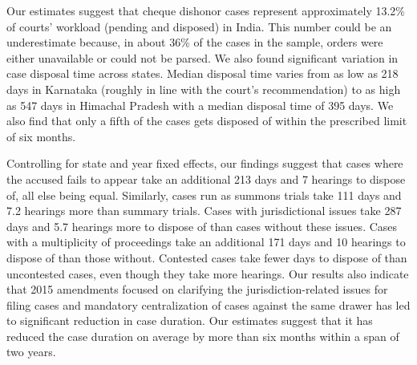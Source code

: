 \documentclass[12pt,a4paper]{article}
\begin{document}


Our estimates suggest that cheque dishonor cases represent approximately 13.2\% of courts' workload (pending and disposed) in India. This number could be an underestimate because, in about 36\% of the cases in the sample, orders were either unavailable or could not be parsed. 
We also found significant variation in case disposal time across states. Median disposal time varies from as low as 218 days in Karnataka (roughly in line with the court's recommendation) to as high as 547 days in Himachal Pradesh with a median disposal time of 395 days. We also find that only a fifth of the cases gets disposed of within the prescribed limit of six months.

Controlling for state and year fixed effects, our findings suggest that cases where the accused fails to appear take an additional 213 days and 7 hearings to dispose of, all else being equal. Similarly, cases run as summons trials take 111 days and 7.2 hearings more than summary trials. Cases with jurisdictional issues take 287 days and 5.7 hearings more to dispose of than cases without these issues. Cases with a multiplicity of proceedings take an additional 171 days and 10 hearings to dispose of than those without. Contested cases take fewer days to dispose of than uncontested cases, even though they take more hearings. Our results also indicate that 2015 amendments focused on clarifying the jurisdiction-related issues for filing cases and mandatory centralization of cases against the same drawer has led to significant reduction in case duration. Our estimates suggest that it has reduced the case duration on average by more than six months within a span of two years.
\end{document}

